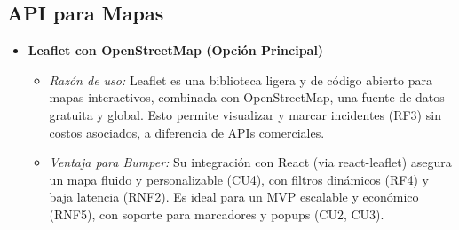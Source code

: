 \subsection*{API para Mapas}
\begin{itemize}
    \item \textbf{Leaflet con OpenStreetMap (Opción Principal)}
    \begin{itemize}
        \item \textit{Razón de uso:} Leaflet es una biblioteca ligera y de código abierto para mapas interactivos, combinada con OpenStreetMap, una fuente de datos gratuita y global. Esto permite visualizar y marcar incidentes (RF3) sin costos asociados, a diferencia de APIs comerciales.
        \item \textit{Ventaja para Bumper:} Su integración con React (via react-leaflet) asegura un mapa fluido y personalizable (CU4), con filtros dinámicos (RF4) y baja latencia (RNF2). Es ideal para un MVP escalable y económico (RNF5), con soporte para marcadores y popups (CU2, CU3).
    \end{itemize}
\end{itemize}